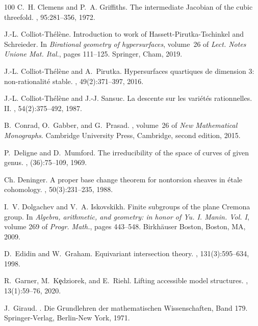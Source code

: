 \documentclass[12pt,reqno]{amsart}
\theoremstyle{plain}
\theoremstyle{remark}
\theoremstyle{definition}
\numberwithin{equation}{section}
\begin{document}
\begin{thebibliography}{100}
C.~H. Clemens and P.~A. Griffiths.
\newblock The intermediate {J}acobian of the cubic threefold.
, 95:281--356, 1972.

J.-L. Colliot-Th\'el\`ene.
\newblock Introduction to work of {H}assett-{P}irutka-{T}schinkel and
  {S}chreieder.
\newblock In {\em Birational geometry of hypersurfaces}, volume~26 of {\em
  Lect. Notes Unione Mat. Ital.}, pages 111--125. Springer, Cham, 2019.

J.-L. Colliot-Th\'{e}l\`ene and A.~Pirutka.
\newblock Hypersurfaces quartiques de dimension 3: non-rationalit\'{e} stable.
, 49(2):371--397, 2016.

J.-L. Colliot-Th\'{e}l\`ene and J.-J. Sansuc.
\newblock La descente sur les vari\'{e}t\'{e}s rationnelles. {II}.
, 54(2):375--492, 1987.

B.~Conrad, O.~Gabber, and G.~Prasad.
, volume~26 of {\em New Mathematical
  Monographs}.
\newblock Cambridge University Press, Cambridge, second edition, 2015.

P.~Deligne and D.~Mumford.
\newblock The irreducibility of the space of curves of given genus.
, (36):75--109, 1969.

Ch. Deninger.
\newblock A proper base change theorem for nontorsion sheaves in \'etale
  cohomology.
, 50(3):231--235, 1988.

I.~V. Dolgachev and V.~A. Iskovskikh.
\newblock Finite subgroups of the plane {C}remona group.
\newblock In {\em Algebra, arithmetic, and geometry: in honor of {Y}u. {I}.
  {M}anin. {V}ol. {I}}, volume 269 of {\em Progr. Math.}, pages 443--548.
  Birkh\"{a}user Boston, Boston, MA, 2009.

D.~Edidin and W.~Graham.
\newblock Equivariant intersection theory.
, 131(3):595--634, 1998.

R.~Garner, M.~K{\selectfont\c{e}}dziorek, and E.~Riehl.
\newblock Lifting accessible model structures.
, 13(1):59--76, 2020.

J.~Giraud.
.
\newblock Die Grundlehren der mathematischen Wissenschaften, Band 179.
  Springer-Verlag, Berlin-New York, 1971.


\end{thebibliography}
\end{document}
